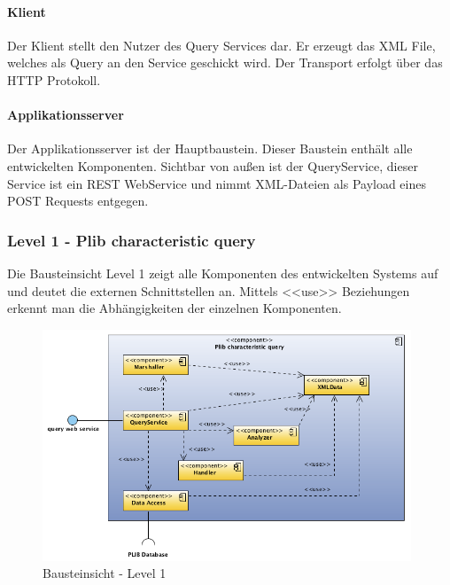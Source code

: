 \paragraph{Klient}

Der Klient stellt den Nutzer des Query Services dar. Er erzeugt das XML File, welches als Query an den Service geschickt wird. Der Transport erfolgt über das HTTP Protokoll.  

\paragraph{Applikationsserver}

Der Applikationsserver ist der Hauptbaustein. Dieser Baustein enthält alle entwickelten Komponenten. Sichtbar von außen ist der QueryService, dieser Service ist ein REST WebService und nimmt XML-Dateien als Payload eines POST Requests entgegen. 

\subsubsection{Level 1 - Plib characteristic query} 

Die Bausteinsicht Level 1 zeigt alle Komponenten des entwickelten Systems auf und deutet die externen Schnittstellen an. Mittels <<use>> Beziehungen erkennt man die Abhängigkeiten der einzelnen Komponenten. 

\begin{figure}[htbp]
	\centering
		\includegraphics[width=0.98\textwidth]{images/bausteinsicht_plib_level1.png}
	\caption{Bausteinsicht - Level 1}
	\label{fig:bausteinsicht_level1}
\end{figure}

